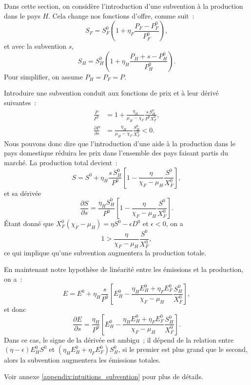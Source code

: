 Dans cette section, on considère l’introduction d’une subvention à la production dans le pays $H$. Cela change nos fonctions d’offre, comme suit~:
$$
S_F = S_F^0\left(1 + \eta_F\frac{P_F - P_F^0}{P_F^0}\right),
$$
et avec la subvention $s$,
$$
S_H = S_H^0\left(1 + \eta_H\frac{P_H + s - P_H^0}{P_H^0}\right).
$$
Pour simplifier, on assume $P_H = P_F = P$.

Introduire une subvention conduit aux fonctions de prix et à leur dérivé suivantes~:
\begin{align*}
\frac{P}{P^0} &= 1 + \frac{\eta_H}{\mu_H - \chi_F} \frac{s \, S_H^0}{P^0 X_F^0}, \\
\frac{\partial P}{\partial s} &= \frac{\eta_H}{\mu_H - \chi_F} \frac{S_H^0}{X_F^0} < 0.
\end{align*}
Nous pouvons donc dire que l’introduction d’une aide à la production dans le pays domestique réduira les prix dans l’ensemble des pays faisant partis du marché.
La production total devient~:
$$
S = S^0 + \eta_H \frac{s \, S_H^0}{P^0}\left[1 - \frac{\eta}{\chi_F - \mu_H}\frac{S^0}{X_F^0}\right],
$$
et sa dérivée
$$
\frac{\partial S}{\partial s} = \frac{\eta_H S_H^0}{P^0}\left[1 - \frac{\eta}{\chi_F - \mu_H}\frac{S^0}{X_F^0}\right].
$$
Étant donné que $X_F^0(\chi_F - \mu_H) = \eta S^0 - \epsilon D^0$ et $\epsilon < 0$, on a
$$
1 > \frac{\eta}{\chi_F - \mu_H}\frac{S^0}{X_F^0},
$$
ce qui implique qu’une subvention augmentera la production totale.

En maintenant notre hypothèse de linéarité entre les émissions et la production, on a~:
$$
E = E^0 + \eta_H \frac{s}{P^0}\left[E_H^0 - \frac{\eta_H E_H^0 + \eta_F E_F^0}{\chi_F - \mu_H}\frac{S_H^0}{X_F^0}\right],
$$
et donc
$$
\frac{\partial E}{\partial s} = \frac{\eta_H}{P^0}\left[E_H^0 - \frac{\eta_H E_H^0 + \eta_F E_F^0}{\chi_F - \mu_H}\frac{S_H^0}{X_F^0}\right].
$$
Dans ce cas, le signe de la dérivée est ambigu~; il dépend de la relation entre $(\eta - \epsilon)E_H^0 S^0$ et $(\eta_H E_H^0 + \eta_F E_F^0) S_H^0$, si le premier est plus grand que le second, alors la subvention augmentera les émissions totales.

Voir annexe \ref{appendix:intuitions_subvention} pour plus de détails.

